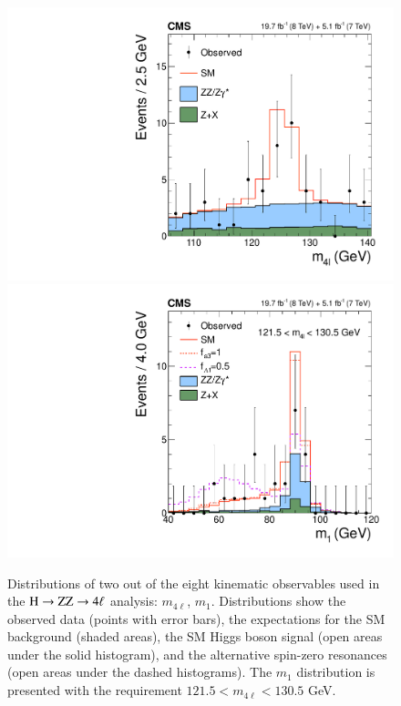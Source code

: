 \begin{figure}[!htbp]
\begin{center}
\centerline{
\includegraphics[width=0.50\linewidth]{figures/cCompare_DataMC_AllTeV_ZZMass.pdf}
\includegraphics[width=0.50\linewidth]{figures/cCompare_DataMC_AllTeV_Z1Mass_SignalEnriched.pdf}
}
\caption{ Distributions of two out of the eight kinematic observables
  used in the $\mathrm{H}\to\mathrm{Z}\mathrm{Z}\to4\ell$ analysis: $m_{4\ell}$, $m_1$.  Distributions
  show the observed data (points with error bars), the expectations
  for the SM background (shaded areas), the SM Higgs boson signal
  (open areas under the solid histogram), and the alternative
  spin-zero resonances (open areas under the dashed histograms).  
  The $m_1$ distribution is presented with the
  requirement $121.5 < m_{4\ell} < 130.5$ GeV.  
\label{fig:hzzkinematics} }
\end{center}
\end{figure}

